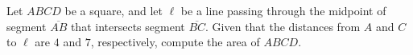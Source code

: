Let $A B C D$ be a square, and let $\ell$ be a line passing through the midpoint of segment $\overline{A B}$ that intersects segment $\overline{B C}$. Given that the distances from $A$ and $C$ to $\ell$ are $4$ and $7$, respectively, compute the area of $A B C D$.